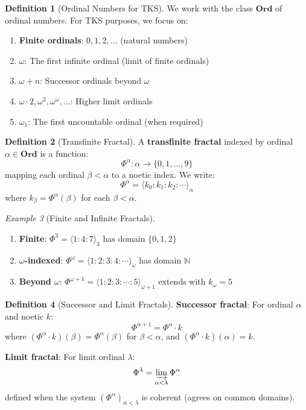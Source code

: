 \documentclass[11pt,twoside,openright]{book}
\theoremstyle{definition}
\newtheorem{definition}{Definition}[chapter]
\theoremstyle{plain}
\theoremstyle{remark}
\newtheorem{example}[definition]{Example}
\newcommand{\Ord}{\mathbf{Ord}}              %
\newcommand{\TransFrac}[1]{\Phi^{#1}}        %
\newcommand{\limfrac}{\varinjlim}            %
\begin{document}
\begin{definition}[Ordinal Numbers for TKS]
\label{def:ordinals-tks}
We work with the class $\Ord$ of ordinal numbers. For TKS purposes, we focus on:
\begin{enumerate}
  \item \textbf{Finite ordinals}: $0, 1, 2, \ldots$ (natural numbers)
  \item \textbf{$\omega$}: The first infinite ordinal (limit of finite ordinals)
  \item \textbf{$\omega + n$}: Successor ordinals beyond $\omega$
  \item \textbf{$\omega \cdot 2, \omega^2, \omega^\omega, \ldots$}: Higher limit ordinals
  \item \textbf{$\omega_1$}: The first uncountable ordinal (when required)
\end{enumerate}
\end{definition}

\begin{definition}[Transfinite Fractal]
\label{def:transfinite-fractal}
A \textbf{transfinite fractal} indexed by ordinal $\alpha \in \Ord$ is a function:
\[
\TransFrac{\alpha} : \alpha \to \{0, 1, \ldots, 9\}
\]
mapping each ordinal $\beta < \alpha$ to a noetic index. We write:
\[
\TransFrac{\alpha} = \langle k_0 : k_1 : k_2 : \cdots \rangle_\alpha
\]
where $k_\beta = \TransFrac{\alpha}(\beta)$ for each $\beta < \alpha$.
\end{definition}

\begin{example}[Finite and Infinite Fractals]
\label{ex:finite-infinite-fractals}
\begin{enumerate}
  \item \textbf{Finite}: $\TransFrac{3} = \langle 1 : 4 : 7 \rangle_3$ has domain $\{0, 1, 2\}$
  \item \textbf{$\omega$-indexed}: $\TransFrac{\omega} = \langle 1 : 2 : 3 : 4 : \cdots \rangle_\omega$ has domain $\mathbb{N}$
  \item \textbf{Beyond $\omega$}: $\TransFrac{\omega+1} = \langle 1 : 2 : 3 : \cdots : 5 \rangle_{\omega+1}$ extends with $k_\omega = 5$
\end{enumerate}
\end{example}

\begin{definition}[Successor and Limit Fractals]
\label{def:succ-limit-fractals}
\textbf{Successor fractal}: For ordinal $\alpha$ and noetic $k$:
\[
\TransFrac{\alpha+1} = \TransFrac{\alpha} \cdot k
\]
where $(\TransFrac{\alpha} \cdot k)(\beta) = \TransFrac{\alpha}(\beta)$ for $\beta < \alpha$, and $(\TransFrac{\alpha} \cdot k)(\alpha) = k$.

\textbf{Limit fractal}: For limit ordinal $\lambda$:
\[
\TransFrac{\lambda} = \limfrac_{\alpha < \lambda} \TransFrac{\alpha}
\]
defined when the system $(\TransFrac{\alpha})_{\alpha < \lambda}$ is coherent (agrees on common domains).
\end{definition}
\end{document}
